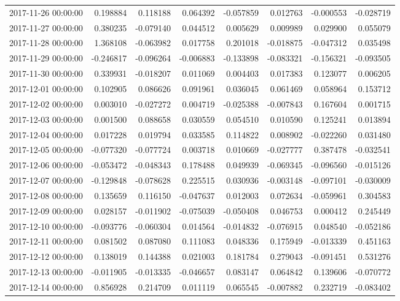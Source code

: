 \begin{tabular}{lrrrrrrr}
2017-11-26 00:00:00 & 0.198884 & 0.118188 & 0.064392 & -0.057859 & 0.012763 & -0.000553 & -0.028719 \\
2017-11-27 00:00:00 & 0.380235 & -0.079140 & 0.044512 & 0.005629 & 0.009989 & 0.029900 & 0.055079 \\
2017-11-28 00:00:00 & 1.368108 & -0.063982 & 0.017758 & 0.201018 & -0.018875 & -0.047312 & 0.035498 \\
2017-11-29 00:00:00 & -0.246817 & -0.096264 & -0.006883 & -0.133898 & -0.083321 & -0.156321 & -0.093505 \\
2017-11-30 00:00:00 & 0.339931 & -0.018207 & 0.011069 & 0.004403 & 0.017383 & 0.123077 & 0.006205 \\
2017-12-01 00:00:00 & 0.102905 & 0.086626 & 0.091961 & 0.036045 & 0.061469 & 0.058964 & 0.153712 \\
2017-12-02 00:00:00 & 0.003010 & -0.027272 & 0.004719 & -0.025388 & -0.007843 & 0.167604 & 0.001715 \\
2017-12-03 00:00:00 & 0.001500 & 0.088658 & 0.030559 & 0.054510 & 0.010590 & 0.125241 & 0.013894 \\
2017-12-04 00:00:00 & 0.017228 & 0.019794 & 0.033585 & 0.114822 & 0.008902 & -0.022260 & 0.031480 \\
2017-12-05 00:00:00 & -0.077320 & -0.077724 & 0.003718 & 0.010669 & -0.027777 & 0.387478 & -0.032541 \\
2017-12-06 00:00:00 & -0.053472 & -0.048343 & 0.178488 & 0.049939 & -0.069345 & -0.096560 & -0.015126 \\
2017-12-07 00:00:00 & -0.129848 & -0.078628 & 0.225515 & 0.030936 & -0.003148 & -0.097101 & -0.030009 \\
2017-12-08 00:00:00 & 0.135659 & 0.116150 & -0.047637 & 0.012003 & 0.072634 & -0.059961 & 0.304583 \\
2017-12-09 00:00:00 & 0.028157 & -0.011902 & -0.075039 & -0.050408 & 0.046753 & 0.000412 & 0.245449 \\
2017-12-10 00:00:00 & -0.093776 & -0.060304 & 0.014564 & -0.014832 & -0.076915 & 0.048540 & -0.052186 \\
2017-12-11 00:00:00 & 0.081502 & 0.087080 & 0.111083 & 0.048336 & 0.175949 & -0.013339 & 0.451163 \\
2017-12-12 00:00:00 & 0.138019 & 0.144388 & 0.021003 & 0.181784 & 0.279043 & -0.091451 & 0.531276 \\
2017-12-13 00:00:00 & -0.011905 & -0.013335 & -0.046657 & 0.083147 & 0.064842 & 0.139606 & -0.070772 \\
2017-12-14 00:00:00 & 0.856928 & 0.214709 & 0.011119 & 0.065545 & -0.007882 & 0.232719 & -0.083402 \\

\end{tabular}
